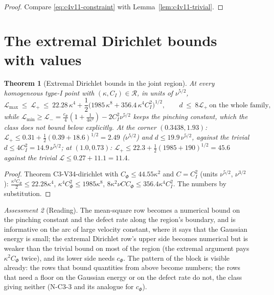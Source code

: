\documentclass[11pt]{article}
\theoremstyle{plain}
\newtheorem{theorem}{Theorem}[section]
\theoremstyle{definition}
\theoremstyle{remark}
\newtheorem{assessment}[theorem]{Assessment}
\begin{document}
\begin{proof}
Compare \eqref{eq:c4v11-constraint} with Lemma~\ref{lem:c4v11-trivial}.
\end{proof}

\section{The extremal Dirichlet bounds with values}
\label{sec:c4v11-dirichlet}

\begin{theorem}[Extremal Dirichlet bounds in the joint region]
\label{thm:c4v11-dirichlet}
At every homogeneous type-I point with \((\kappa,C_I)\in\mathcal R\), in units of \(\nu^{5/2}\),
\begin{equation}
 \mathcal L_{\max}\ \le\ \mathcal L_+\ \le\ 22.28\,\kappa^4+\frac12\bigl(1985\,\kappa^8+356.4\,\kappa^4C_I^2\bigr)^{1/2},\qquad
 d\ \le\ 8\mathcal L_+\ \text{on the whole family},
 \label{eq:c4v11-Lplus}
\end{equation}
while \(\mathcal L_{\min}\ge\mathcal L_-=\frac{c_\Phi}4(1+\frac1{4\kappa^2})-2C_I^2\nu^{5/2}\) keeps the pinching constant,
which the class does not bound below explicitly.  At the corner
\((0.3438,1.93)\): \(\mathcal L_+\le0.31+\frac12(0.39+18.6)^{1/2}=2.49\) (\(\nu^{5/2}\)) and \(d\le19.9\,\nu^{5/2}\),
against the trivial \(d\le4C_I^2=14.9\,\nu^{5/2}\); at \((1.0,0.73)\): \(\mathcal L_+\le22.3+\frac12(1985+190)^{1/2}=45.6\)
against the trivial \(\mathcal L\le0.27+11.1=11.4\).
\end{theorem}

\begin{proof}
Theorem C3-V34-dirichlet with \(C_\Phi\le44.55\kappa^2\) and \(C=C_I^2\) (units \(\nu^{5/2}\),
\(\nu^{3/2}\)): \(\frac{\kappa^2C_\Phi}2\le22.28\kappa^4\), \(\kappa^4C_\Phi^2\le1985\kappa^8\), \(8\kappa^2\nu CC_\Phi\le356.4\kappa^4C_I^2\).  The
numbers by substitution.
\end{proof}

\begin{assessment}[Reading]
\label{ass:c4v11-reading}
The mean-square row becomes a numerical bound on the pinching
constant and the defect rate along the region's boundary, and is
informative on the arc of large velocity constant, where it says
that the Gaussian energy is small; the extremal Dirichlet row's
upper side becomes numerical but is weaker than the trivial bound
on most of the region (the extremal argument pays \(\kappa^2C_\Phi\) twice),
and its lower side needs \(c_\Phi\).  The pattern of the block is visible
already: the rows that bound quantities from above become numbers;
the rows that need a floor on the Gaussian energy or on the defect
rate do not, the class giving neither (N-C3-3 and its analogue for
\(c_\Phi\)).
\end{assessment}
\end{document}
